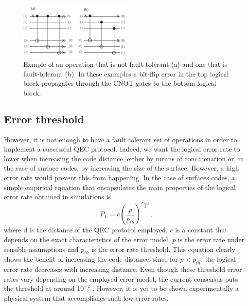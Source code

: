 \begin{figure}[htbp]
  \centering
  \includegraphics[width=0.5\textwidth]{images/fault_tolerance.pdf}
  \caption{Exmple of an operation that is not fault-tolerant (a) and one that is
    fault-tolerant (b). In these examples a bit-flip error in the top logical
    block propagates through the CNOT gates to the bottom logical block.}
  \label{fig:fault_tol}
\end{figure}

\subsection{Error threshold}
However, it is not enough to have a fault tolerant set of operations in order to
implement a successful QEC protocol. Indeed, we want the logical error rate to
lower when increasing the code distance, either by means of concatenation or, in
the case of surface codes, by increasing the size of the surface. However, a high
error rate would prevent this from happening. In the case of surfaces codes, a
simple empirical equation that encapsulates the main properties of the logical
error rate obtained in simulations is
\cite{fowler12_surfac_codes}
\begin{equation}
  \label{eq:1}
  P_L = c\left(\frac{p}{p_{th}}\right)^{\frac{ d+1 }{2}},
\end{equation}
where d is the distance of the QEC protocol employed, $c$ is a constant that
depends on the exact characteristics of the error model, $p$ is the error rate
under sensible assumptions and $p_{th}$ is the error rate threshold. This
equation clearly shows the benefit of increasing the code distance, since for
$p<p_{th}$, the logical error rate decreases with increasing distance. Even
though these threshold error rates vary depending on the employed error model,
the current consensus puts the threshold at around $10^{-2}$ \cite{terhal15}
\cite{Versluis_2017}. However, it is yet to be shown experimentally a physical
system that accomplishes such low error rates.



